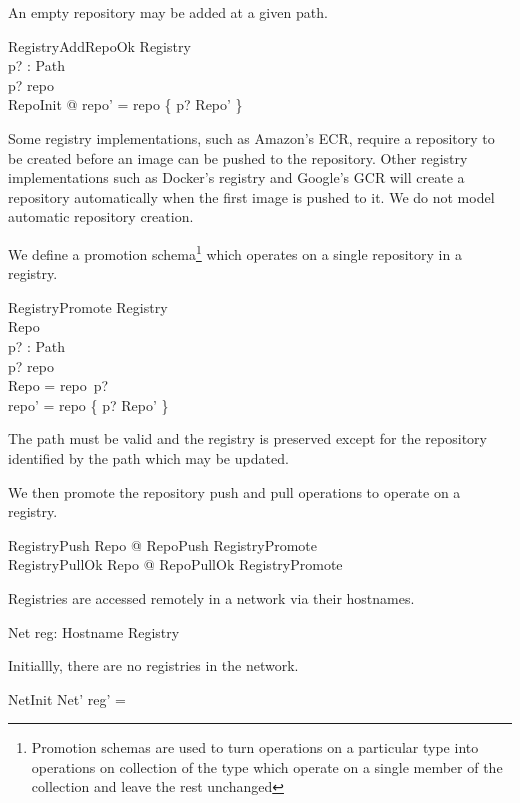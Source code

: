 \documentclass[a4paper,twoside,12pt]{article}
\begin{document}
An empty repository may be added at a given path.
\begin{schema}{RegistryAddRepoOk}
  \Delta Registry \\
  p? : Path \\
\where
  p? \notin \dom repo \\
  \exists RepoInit @ repo' = repo \cup \{ p? \mapsto \theta Repo' \}
\end{schema}
Some registry implementations, such as Amazon's ECR, require a repository to be created before an image can be pushed to the repository.
Other registry implementations such as Docker's registry and Google's GCR will create a repository automatically when the first image is pushed to it. We do not model automatic repository creation.

\pagebreak
We define a promotion schema\footnote{Promotion schemas are used to turn operations on a particular type into operations on collection of the type which operate on a single member of the collection and leave the rest unchanged} which operates on a single repository in a registry.
\begin{schema}{RegistryPromote}
  \Delta Registry \\
  \Delta Repo \\
  p? : Path \\
\where
  p? \in \dom repo \\
  \theta Repo = repo~p? \\
  repo' = repo \oplus \{ p? \mapsto \theta Repo' \} \\
\end{schema}
The path must be valid and the registry is preserved except for the repository identified by the path which may be updated.

We then promote the repository push and pull operations to operate on a registry.
\begin{zed}
  RegistryPush  \exists \Delta Repo @ RepoPush \land RegistryPromote \\
  RegistryPullOk  \exists \Delta Repo @ RepoPullOk \land RegistryPromote \\
\end{zed}
  
Registries are accessed remotely in a network via their hostnames.
\begin{schema}{Net}
    reg: Hostname \pfun Registry \\
\end{schema}

Initiallly, there are no registries in the network.
\begin{schema}{NetInit}
  Net'
\where
  reg' = \emptyset
\end{schema}
\end{document}
